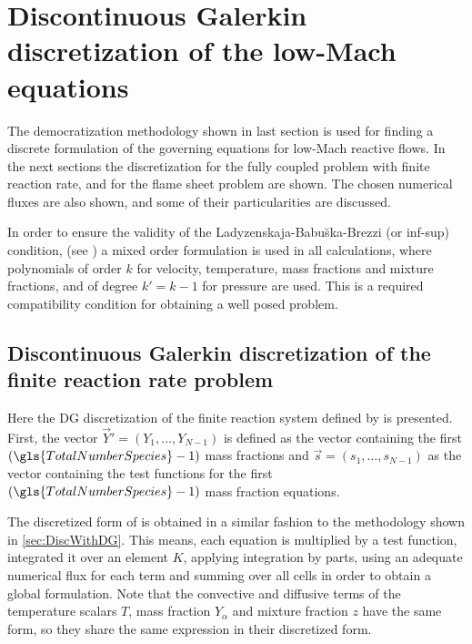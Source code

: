 \section{Discontinuous Galerkin discretization of the low-Mach equations}
The democratization methodology shown in last section is used for finding a discrete formulation of the governing equations for low-Mach reactive flows. In the next sections the discretization for the fully coupled problem with finite reaction rate, and for the flame sheet problem are shown. The chosen numerical fluxes are also shown, and some of their particularities are discussed. 

In order to ensure the validity  of the  Ladyzenskaja-Babu\u{s}ka-Brezzi (or inf-sup) condition, (see \textcite{babuskaFiniteElementMethod1973})  a mixed order formulation is used in all calculations, where polynomials of order $k$ for velocity, temperature, mass fractions and mixture fractions, and of degree $k' = k-1$ for pressure are used. This is a required compatibility condition for obtaining a well posed problem. 
\subsection{Discontinuous Galerkin discretization of the finite reaction rate problem}
Here the DG discretization of the finite reaction system defined by  is presented. 
First, the vector $\vec{Y}' = \left(Y_1,\dots,Y_{N-1}\right)$ is defined as the vector containing the first $(\gls{TotalNumberSpecies}-1)$ mass fractions and $\vec{s} = \left(s_1, \dots, s_{N-1} \right)$ as the vector containing the test functions for the first $(\gls{TotalNumberSpecies}-1)$  mass fraction equations. 

The discretized form of  is obtained in a similar fashion to the methodology shown in \cref{sec:DiscWithDG}. This means, each equation is multiplied by a test function, integrated it over an element $K$, applying integration by parts, using an adequate numerical flux for each term and summing over all cells in order to obtain a global formulation. Note that the convective and diffusive terms of the temperature scalars $T$, mass fraction $Y_\alpha$ and mixture fraction $z$ have the same form, so they share the same expression in their discretized form.

